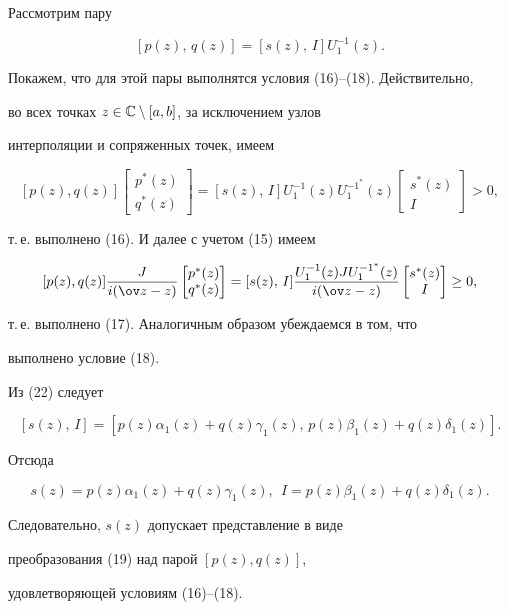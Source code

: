 \begin{pf}


Рассмотрим пару


\begin{equation}


[p(z),\, q(z)]=[s(z),\, I]U_1^{-1}(z).


\end{equation}


Покажем, что для этой пары выполнятся условия (16)--(18). Действительно,


во всех точках $z\in {\Bbb C}\setminus [a,b] $, за исключением узлов


интерполяции и сопряженных точек, имеем


$$


[p(z),q(z)] \begin{bmatrix} p^*(z) \\ q^*(z) \end{bmatrix}=


[s(z),\,I] U_1^{-1}(z)U_1^{-1^*}(z)


\begin{bmatrix} s^*(z) \\ I \end{bmatrix}>0,


$$


т.\,е. выполнено (16). И далее с учетом (15) имеем


$$


[p(z),q(z)] \frac{J}{i(\ov z -z)}


\begin{bmatrix} p^*(z) \\ q^*(z) \end{bmatrix}


=[s(z),\,I] \frac{U_1^{-1}(z)JU_1^{-1^*}(z)}{i(\ov z-z)}


\begin{bmatrix} s^*(z) \\ I \end{bmatrix}\geq 0,


$$


т.\,е. выполнено (17). Аналогичным образом убеждаемся в том, что


выполнено условие (18).





Из (22) следует


$$


[ s(z),\,I]=[p(z)\alpha_1(z)+q(z)\gamma_1(z),


\, p(z)\beta_1(z)+q(z)\delta_1(z)].


$$


Отсюда


$$


s(z)=p(z)\alpha_1(z)+q(z)\gamma_1(z),\ \ I=p(z)\beta_1(z)+q(z)\delta_1(z).


$$


Следовательно, $s(z)$ допускает представление в виде


преобразования (19) над парой $[p(z),q(z)]$,


удовлетворяющей условиям (16)--(18).


\end{pf}





